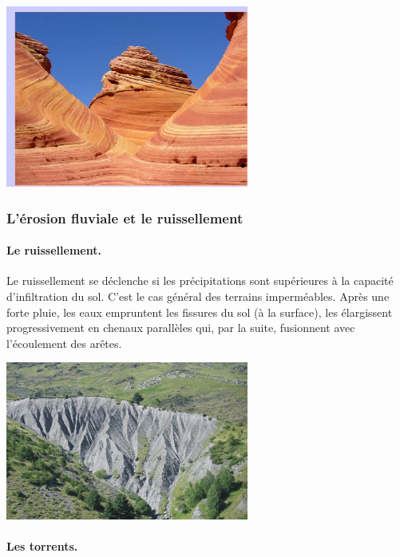 \documentclass[a4paper,11pt]{article}
\begin{document}
\begin{center}
  \includegraphics[width=8cm]{Images/Erosion/erosion_eolienne.JPG}
\end{center}

\subsubsection{L'érosion fluviale et le ruissellement}

\paragraph{Le ruissellement.}

Le ruissellement se déclenche si les précipitations sont supérieures à la capacité d'infiltration du sol. C'est le cas général des terrains imperméables. 
Après une forte pluie, les eaux empruntent les fissures du sol (à la surface), les élargissent progressivement en chenaux parallèles qui, par la suite, fusionnent avec l'écoulement des arêtes.

\begin{center}
  \includegraphics[width=8cm]{Images/Erosion/bad_lands.jpg}
\end{center}

\paragraph{Les torrents.}
\end{document}
